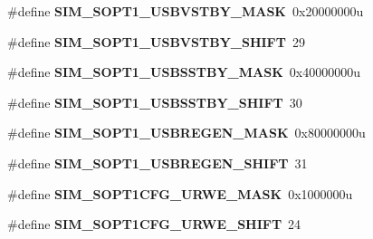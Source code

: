\begin{DoxyCompactItemize}
\item 
\#define {\bfseries S\+I\+M\+\_\+\+S\+O\+P\+T1\+\_\+\+U\+S\+B\+V\+S\+T\+B\+Y\+\_\+\+M\+A\+SK}~0x20000000u\hypertarget{group__SIM__Register__Masks_gaaf0b406e4bd1800083f48727a7cde829}{}\label{group__SIM__Register__Masks_gaaf0b406e4bd1800083f48727a7cde829}

\item 
\#define {\bfseries S\+I\+M\+\_\+\+S\+O\+P\+T1\+\_\+\+U\+S\+B\+V\+S\+T\+B\+Y\+\_\+\+S\+H\+I\+FT}~29\hypertarget{group__SIM__Register__Masks_gae945165e21faf14e58288bce0918482a}{}\label{group__SIM__Register__Masks_gae945165e21faf14e58288bce0918482a}

\item 
\#define {\bfseries S\+I\+M\+\_\+\+S\+O\+P\+T1\+\_\+\+U\+S\+B\+S\+S\+T\+B\+Y\+\_\+\+M\+A\+SK}~0x40000000u\hypertarget{group__SIM__Register__Masks_ga93a808f7a1d75e26bc3ed565ab257617}{}\label{group__SIM__Register__Masks_ga93a808f7a1d75e26bc3ed565ab257617}

\item 
\#define {\bfseries S\+I\+M\+\_\+\+S\+O\+P\+T1\+\_\+\+U\+S\+B\+S\+S\+T\+B\+Y\+\_\+\+S\+H\+I\+FT}~30\hypertarget{group__SIM__Register__Masks_ga8a24334d1be5bd01017bd364dd53f268}{}\label{group__SIM__Register__Masks_ga8a24334d1be5bd01017bd364dd53f268}

\item 
\#define {\bfseries S\+I\+M\+\_\+\+S\+O\+P\+T1\+\_\+\+U\+S\+B\+R\+E\+G\+E\+N\+\_\+\+M\+A\+SK}~0x80000000u\hypertarget{group__SIM__Register__Masks_gac60c367119b3dcc752c4cf857b8a59b5}{}\label{group__SIM__Register__Masks_gac60c367119b3dcc752c4cf857b8a59b5}

\item 
\#define {\bfseries S\+I\+M\+\_\+\+S\+O\+P\+T1\+\_\+\+U\+S\+B\+R\+E\+G\+E\+N\+\_\+\+S\+H\+I\+FT}~31\hypertarget{group__SIM__Register__Masks_ga99e46c34c02e39338c9b80775bad09db}{}\label{group__SIM__Register__Masks_ga99e46c34c02e39338c9b80775bad09db}

\item 
\#define {\bfseries S\+I\+M\+\_\+\+S\+O\+P\+T1\+C\+F\+G\+\_\+\+U\+R\+W\+E\+\_\+\+M\+A\+SK}~0x1000000u\hypertarget{group__SIM__Register__Masks_gaa4e1ee8f60c8c15ad553c2dfb82c2039}{}\label{group__SIM__Register__Masks_gaa4e1ee8f60c8c15ad553c2dfb82c2039}

\item 
\#define {\bfseries S\+I\+M\+\_\+\+S\+O\+P\+T1\+C\+F\+G\+\_\+\+U\+R\+W\+E\+\_\+\+S\+H\+I\+FT}~24\hypertarget{group__SIM__Register__Masks_ga07bf2ffc61aacca96748747fa8df7062}{}\label{group__SIM__Register__Masks_ga07bf2ffc61aacca96748747fa8df7062}


\end{DoxyCompactItemize}
